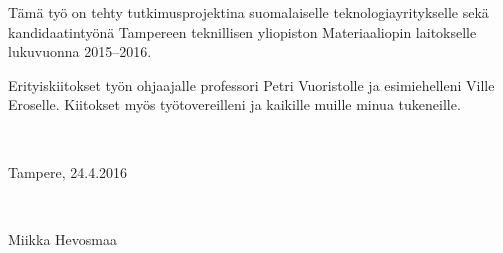 \documentclass[12pt,a4paper,finnish]{tutthesis}
\begin{document}

Tämä työ on tehty tutkimusprojektina suomalaiselle teknologiayritykselle sekä
kandidaatintyönä Tampereen teknillisen yliopiston Materiaaliopin laitokselle
lukuvuonna 2015--2016.

Erityiskiitokset työn ohjaajalle professori Petri Vuoristolle ja esimiehelleni Ville Eroselle.
Kiitokset myös työtovereilleni ja kaikille muille minua tukeneille.

~ 

Tampere, 24.4.2016

~


Miikka Hevosmaa



%
%

\renewcommand\contentsname{Sisällys}         %
\setcounter{tocdepth}{3}                      %
\tableofcontents                              %

\renewcommand\listfigurename{Kuvaluettelo}    %
\listoffigures                                 %
\markboth{}{}                                  %

\renewcommand\listtablename{Taulukkoluettelo} %
\listoftables                                  %
\markboth{}{}                                  %


\end{document}

